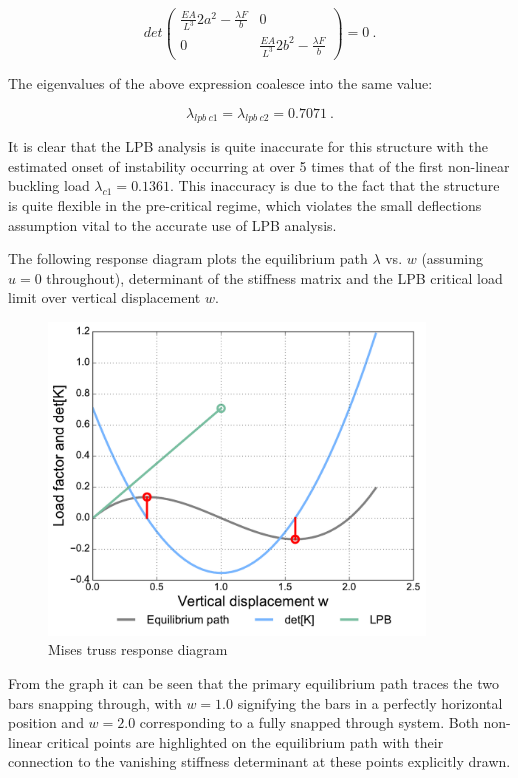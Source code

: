  \begin{equation} 
det
\begin{pmatrix}
\frac{EA}{L^3} 2a^2 - \frac{\lambda F}{b} & 0 \\
0 &  \frac{EA}{L^3} 2b^2 - \frac{\lambda F}{b}
\end{pmatrix}
= 0
\label{eqstab9}\ .
\end{equation}

The eigenvalues of the above expression coalesce into the same value:

\begin{equation} 
\lambda_{lpb\ c1} = 
\lambda_{lpb\ c2} = 0.7071
\label{eqstab10}\ .
\end{equation}

It is clear that the LPB analysis is quite inaccurate for this structure with the estimated onset of instability occurring at over 5 times that of the first non-linear buckling load $\lambda_{c1} = 0.1361$. This inaccuracy is due to the fact that the structure is quite flexible in the pre-critical regime, which violates the small deflections assumption vital to the accurate use of LPB analysis.

The following response diagram plots the equilibrium path $\lambda$ vs. $w$ (assuming $u = 0$ throughout), determinant of the stiffness matrix and the LPB critical load limit over vertical displacement $w$.

\begin{figure}[H]
	\centering
	\def\svgwidth{\columnwidth}
	\includegraphics[width=10cm]{images/stability_analysis_mises_truss_1x1.pdf}
	\caption{Mises truss response diagram}
	\label{stab2}
\end{figure}

From the graph it can be seen that the primary equilibrium path traces the two bars snapping through, with $w=1.0$ signifying the bars in a perfectly horizontal position and $w=2.0$ corresponding to a fully snapped through system. Both non-linear critical points are highlighted on the equilibrium path with their connection to the vanishing stiffness determinant at these points explicitly drawn.

